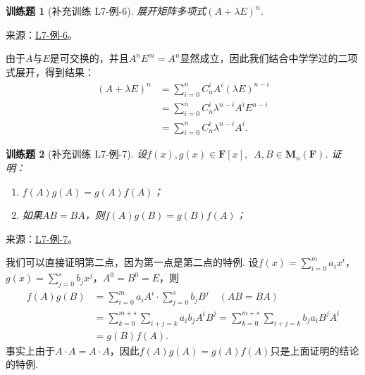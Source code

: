 \documentclass[UTF8,12pt,a4paper,fontset=fandol]{ctexart}
\newtheorem{exercise}{训练题}[section]
\begin{document}
\begin{exercise}[补充训练 L7-例-6]\label{prob:L7-例-6}
展开矩阵多项式$(A+\lambda E)^n$.
\end{exercise}
\noindent 来源：\href{https://github.com/yhwu-is/Linear-Algebra-Left-Undone/blob/new/%E8%AE%B2%E4%B9%89/%E4%B8%93%E9%A2%98/7%20%E7%BA%BF%E6%80%A7%E6%98%A0%E5%B0%84%E7%9F%A9%E9%98%B5%E8%A1%A8%E7%A4%BA%E4%B8%8E%E7%9F%A9%E9%98%B5%E8%BF%90%E7%AE%97%E5%9F%BA%E7%A1%80.tex}{L7-例-6}。
\begin{solve}
由于$A$与$E$是可交换的，并且$A^nE^m=A^n$显然成立，因此我们结合中学学过的二项式展开，得到结果：
    \begin{align*}
        (A+\lambda E)^n & =\sum_{i=0}^nC_n^iA^i(\lambda E)^{n-i}    \\
                        & =\sum_{i=0}^nC_n^i\lambda^{n-i}A^iE^{n-i} \\
                        & =\sum_{i=0}^nC_n^i\lambda^{n-i}A^i.
    \end{align*}
\end{solve}

\begin{exercise}[补充训练 L7-例-7]\label{prob:L7-例-7}
设$f(x),g(x) \in \mathbf{F}[x],\enspace A,B \in \mathbf{M}_n(\mathbf{F})$. 证明：
    \begin{enumerate}
        \item $f(A)g(A)=g(A)f(A)$；

        \item 如果$AB=BA$，则$f(A)g(B)=g(B)f(A)$；
    \end{enumerate}
\end{exercise}
\noindent 来源：\href{https://github.com/yhwu-is/Linear-Algebra-Left-Undone/blob/new/%E8%AE%B2%E4%B9%89/%E4%B8%93%E9%A2%98/7%20%E7%BA%BF%E6%80%A7%E6%98%A0%E5%B0%84%E7%9F%A9%E9%98%B5%E8%A1%A8%E7%A4%BA%E4%B8%8E%E7%9F%A9%E9%98%B5%E8%BF%90%E7%AE%97%E5%9F%BA%E7%A1%80.tex}{L7-例-7}。
\begin{solve}
我们可以直接证明第二点，因为第一点是第二点的特例. 设$f(x)=\displaystyle\sum_{i=0}^ma_ix^i$，$g(x)=\displaystyle\sum_{j=0}^sb_jx^j$，$A^0=B^0=E$，则
    \begin{align*}
        f(A)g(B) & =\sum_{i=0}^ma_iA^i\cdot \sum_{j=0}^sb_jB^j\quad(AB=BA)                            \\
                 & =\sum_{k=0}^{m+s}\sum_{i+j=k}a_ib_jA^iB^j=\sum_{k=0}^{m+s}\sum_{i+j=k}b_ja_iB^jA^i \\
                 & =g(B)f(A).
    \end{align*}
    事实上由于$A\cdot A=A\cdot A$，因此$f(A)g(A)=g(A)f(A)$只是上面证明的结论的特例.
\end{solve}
\end{document}
